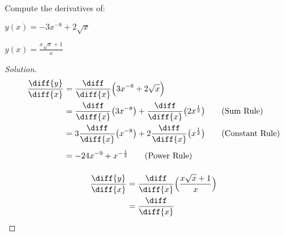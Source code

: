 \documentclass[crop=false,class=article,oneside]{standalone}
\begin{document}
            \begin{problem}
                Compute the derivatives of:
                \begin{enumerate}[label=(\alph*)]
                    \begin{multicols}{2}
                        \item $y(x)=-3x^{-8}+2\sqrt{x}$
                        \item $y(x)=\frac{x\sqrt{x}+1}{x}$
                    \end{multicols}
                \end{enumerate}
            \end{problem}
            \begin{proof}[Solution]
                \par\hfill\par
                \begin{minipage}[b]{.49\textwidth}
                    \centering
                    \begin{align*}
                        \frac{\diff{y}}{\diff{x}}
                        &=\frac{\diff}{\diff{x}}
                            \Big(3x^{-8}+2\sqrt{x}\Big)\\
                        &=\frac{\diff}{\diff{x}}
                            \big(3x^{-8}\big)
                        +\frac{\diff}{\diff{x}}
                            \big(2x^{\frac{1}{2}}\big)
                        \tag{Sum Rule}\\
                        &=3\frac{\diff}{\diff{x}}
                            \big(x^{-8}\big)+
                            2\frac{\diff}{\diff{x}}
                            \big(x^{\frac{1}{2}}\big)
                        \tag{Constant Rule}\\
                        &=-24x^{-9}+x^{-\frac{1}{2}}
                        \vphantom{\frac{\diff}{\diff}}
                        \tag{Power Rule}
                    \end{align*}
                \end{minipage}
                \hfill
                \vline
                \begin{minipage}[b]{.49\textwidth}
                    \centering
                    \begin{align*}
                        \frac{\diff{y}}{\diff{x}}
                        &=\frac{\diff}{\diff{x}}
                            \Big(\frac{x\sqrt{x}+1}{x}\Big)\\
                        &=\frac{\diff}{\diff{x}}

\end{align*}
\end{minipage}
\end{proof}
\end{document}
